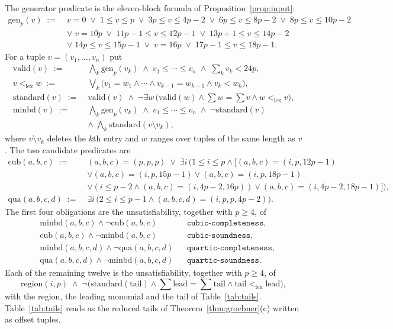 \documentclass[11pt]{article}
\theoremstyle{definition}
\theoremstyle{remark}
\begin{document}
The generator predicate is the eleven-block formula of Proposition~\ref{prop:input}:
\begin{align*}
\mathrm{gen}_p(v)\;:=\;& v=0\;\vee\;1\leq v\leq p\;\vee\;3p\leq v\leq4p-2\;\vee\;6p\leq v\leq8p-2\;\vee\;8p\leq v\leq10p-2\\
&\vee\;v=10p\;\vee\;11p-1\leq v\leq12p-1\;\vee\;13p+1\leq v\leq14p-2\\
&\vee\;14p\leq v\leq15p-1\;\vee\;v=16p\;\vee\;17p-1\leq v\leq18p-1.
\end{align*}
For a tuple $v=(v_1,\ldots,v_n)$ put
\begin{align*}
\mathrm{valid}(v)\;:=\;&\bigwedge_{k}\mathrm{gen}_p(v_k)\;\wedge\;v_1\leq\cdots\leq v_n\;\wedge\;\textstyle\sum_kv_k<24p,\\
v<_{\mathrm{lex}}w\;:=\;&\bigvee_{k}\bigl(v_1=w_1\wedge\cdots\wedge v_{k-1}=w_{k-1}\wedge v_k<w_k\bigr),\\
\mathrm{standard}(v)\;:=\;&\mathrm{valid}(v)\;\wedge\;\neg\exists w\,\bigl(\mathrm{valid}(w)\wedge\textstyle\sum w=\sum v\wedge w<_{\mathrm{lex}}v\bigr),\\
\mathrm{minbd}(v)\;:=\;&\bigwedge_k\mathrm{gen}_p(v_k)\;\wedge\;v_1\leq\cdots\leq v_n\;\wedge\;\neg\mathrm{standard}(v)\\
&\wedge\;\bigwedge_{k}\mathrm{standard}(v\setminus v_k),
\end{align*}
where $v\setminus v_k$ deletes the $k$th entry and $w$ ranges over tuples of the same length as $v$.
The two candidate predicates are
\begin{align*}
\mathrm{cub}(a,b,c)\;:=\;&(a,b,c)=(p,p,p)\;\vee\;\exists i\,\bigl(1\leq i\leq p\wedge\bigl[(a,b,c)=(i,p,12p-1)\\
&\vee(a,b,c)=(i,p,15p-1)\vee(a,b,c)=(i,p,18p-1)\\
&\vee(i\leq p-2\wedge(a,b,c)=(i,4p-2,16p))\vee(a,b,c)=(i,4p-2,18p-1)\bigr]\bigr),\\
\mathrm{qua}(a,b,c,d)\;:=\;&\exists i\,\bigl(2\leq i\leq p-1\wedge(a,b,c,d)=(i,p,p,4p-2)\bigr).
\end{align*}
The first four obligations are the unsatisfiability, together with $p\geq4$, of
\begin{align*}
&\mathrm{minbd}(a,b,c)\wedge\neg\mathrm{cub}(a,b,c)&&\texttt{cubic-completeness},\\
&\mathrm{cub}(a,b,c)\wedge\neg\mathrm{minbd}(a,b,c)&&\texttt{cubic-soundness},\\
&\mathrm{minbd}(a,b,c,d)\wedge\neg\mathrm{qua}(a,b,c,d)&&\texttt{quartic-completeness},\\
&\mathrm{qua}(a,b,c,d)\wedge\neg\mathrm{minbd}(a,b,c,d)&&\texttt{quartic-soundness}.
\end{align*}
Each of the remaining twelve is the unsatisfiability, together with $p\geq4$, of
\[
 \mathrm{region}(i,p)\;\wedge\;\neg\bigl(\mathrm{standard}(\mathrm{tail})\wedge\textstyle\sum\mathrm{lead}=\sum\mathrm{tail}\wedge\mathrm{tail}<_{\mathrm{lex}}\mathrm{lead}\bigr),
\]
with the region, the leading monomial and the tail of Table~\ref{tab:tails}. Table~\ref{tab:tails}
reads as the reduced tails of Theorem~\ref{thm:groebner}(c) written as offset tuples.
\end{document}

